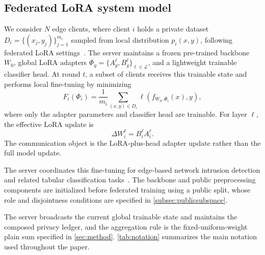 \documentclass[a4paper,fleqn]{cas-dc}
\begin{document}
\subsection{Federated LoRA system model}
\label{subsec:edge-setting}
\par
We consider $N$ edge clients, where client $i$ holds a private dataset $D_i=\{(x_j,y_j)\}_{j=1}^{m_i}$ sampled from local distribution $p_i(x,y)$, following federated LoRA settings~\cite{sun2024ffalora,singhal2025fedexlora}. The server maintains a frozen pre-trained backbone $W_0$, global LoRA adapters $\Phi_g=\{A_g^\ell,B_g^\ell\}_{\ell\in\mathcal{L}}$, and a lightweight trainable classifier head. At round $t$, a subset of clients receives this trainable state and performs local fine-tuning by minimizing
\begin{equation}
F_i(\Phi_i)=\frac{1}{m_i}\sum_{(x,y)\in D_i}\ell(f_{W_0,\Phi_i}(x),y),
\end{equation}
where only the adapter parameters and classifier head are trainable. For layer $\ell$, the effective LoRA update is
\begin{equation}
\Delta W_i^\ell = B_i^\ell A_i^\ell .
\end{equation}
The communication object is the LoRA-plus-head adapter update rather than the full model update.
\par
The server coordinates this fine-tuning for edge-based network intrusion detection and related tabular classification tasks~\cite{qu2025mobileedge}. The backbone and public preprocessing components are initialized before federated training using a public split, whose role and disjointness conditions are specified in \cref{subsec:publicsubspace}.
\par
The server broadcasts the current global trainable state and maintains the composed privacy ledger, and the aggregation rule is the fixed-uniform-weight plain sum specified in \cref{sec:method}. \cref{tab:notation} summarizes the main notation used throughout the paper.
\par
\par
\end{document}
